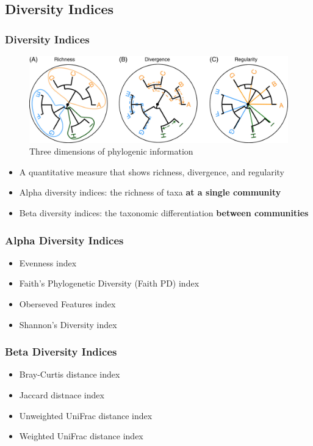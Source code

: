 \documentclass{beamer}
\begin{document}
    \subsection{Diversity Indices}
    \begin{frame}
        \frametitle{Diversity Indices}

        \begin{figure}
            \includegraphics[width=0.6 \linewidth]{figures/phylogenic.jpg}
            \caption{Three dimensions of phylogenic information \protect\cite{phylogenetic1}}
        \end{figure}

        \begin{itemize}
            \item A quantitative measure that shows richness, divergence, and regularity \cite{phylogenetic1}
            \item Alpha diversity indices: the richness of taxa \textbf{at a single community}
            \item Beta diversity indices: the taxonomic differentiation \textbf{between communities}
        \end{itemize}
    \end{frame}

    \begin{frame}
        \frametitle{Alpha  Diversity Indices}

        \begin{itemize}
            \item Evenness index
            \item Faith's Phylogenetic Diversity (Faith PD) index
            \item Oberseved Features index
            \item Shannon's Diversity index
        \end{itemize}
    \end{frame}

    \begin{frame}
        \frametitle{Beta Diversity Indices}

        \begin{itemize}
            \item Bray-Curtis distance index
            \item Jaccard distnace index
            \item Unweighted UniFrac distance index
            \item Weighted UniFrac distance index
        \end{itemize}
    \end{frame}
\end{document}
